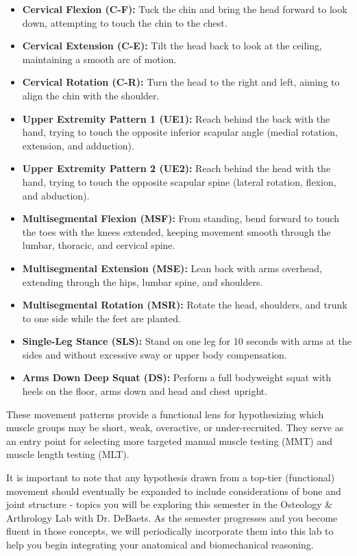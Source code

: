 \begin{itemize}
  \item \textbf{Cervical Flexion (C-F):} Tuck the chin and bring the head forward to look down, attempting to touch the chin to the chest.
  \item \textbf{Cervical Extension (C-E):} Tilt the head back to look at the ceiling, maintaining a smooth arc of motion.
  \item \textbf{Cervical Rotation (C-R):} Turn the head to the right and left, aiming to align the chin with the shoulder.
  \item \textbf{Upper Extremity Pattern 1 (UE1):} Reach behind the back with the hand, trying to touch the opposite inferior scapular angle (medial rotation, extension, and adduction).
  \item \textbf{Upper Extremity Pattern 2 (UE2):} Reach behind the head with the hand, trying to touch the opposite scapular spine (lateral rotation, flexion, and abduction).
  \item \textbf{Multisegmental Flexion (MSF):} From standing, bend forward to touch the toes with the knees extended, keeping movement smooth through the lumbar, thoracic, and cervical spine.
  \item \textbf{Multisegmental Extension (MSE):} Lean back with arms overhead, extending through the hips, lumbar spine, and shoulders.
  \item \textbf{Multisegmental Rotation (MSR):} Rotate the head, shoulders, and trunk to one side while the feet are planted.
  \item \textbf{Single-Leg Stance (SLS):} Stand on one leg for 10 seconds with arms at the sides and without excessive sway or upper body compensation.
  \item \textbf{Arms Down Deep Squat (DS):} Perform a full bodyweight squat with heels on the floor, arms down and head and chest upright.
\end{itemize}

These movement patterns provide a functional lens for hypothesizing which muscle groups may be short, weak, overactive, or under-recruited. They serve as an entry point for selecting more targeted manual muscle testing (MMT) and muscle length testing (MLT).

It is important to note that any hypothesis drawn from a top-tier (functional) movement should eventually be expanded to include considerations of bone and joint structure - topics you will be exploring this semester in the Osteology \& Arthrology Lab with Dr. DeBaets. As the semester progresses and you become fluent in those concepts, we will periodically incorporate them into this lab to help you begin integrating your anatomical and biomechanical reasoning.

